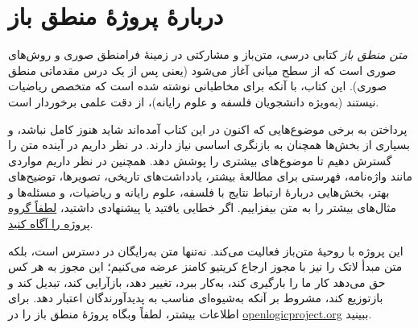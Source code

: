 \chapter*{دربارهٔ پروژهٔ منطق باز}


\textit{متن منطق باز} کتابی درسی، متن‌باز و مشارکتی در زمینهٔ
فرامنطق صوری و روش‌های صوری است که از سطح میانی آغاز می‌شود
(یعنی پس از یک درس مقدماتی منطق صوری). این کتاب، با آنکه برای
مخاطبانی نوشته شده است که متخصص ریاضیات نیستند (به‌ویژه دانشجویان
فلسفه و علوم رایانه)، از دقت علمی برخوردار است.

پرداختن به برخی موضوع‌هایی که اکنون در این کتاب آمده‌اند شاید هنوز
کامل نباشد، و بسیاری از بخش‌ها همچنان به بازنگری اساسی نیاز دارند.
در نظر داریم در آینده متن را گسترش دهیم تا موضوع‌های بیشتری را پوشش
دهد. همچنین در نظر داریم مواردی مانند واژه‌نامه، فهرستی برای مطالعهٔ
بیشتر، یادداشت‌های تاریخی، تصویرها، توضیح‌های بهتر، بخش‌هایی دربارهٔ
ارتباط نتایج با فلسفه، علوم رایانه و ریاضیات، و مسئله‌ها و مثال‌های
بیشتر را به متن بیفزاییم. اگر خطایی یافتید یا پیشنهادی داشتید،
\href{https://github.com/OpenLogicProject/OpenLogic/wiki/Contributing}{لطفاً گروه پروژه را آگاه کنید}.

این پروژه با روحیهٔ متن‌باز فعالیت می‌کند. نه‌تنها متن به‌رایگان در
دسترس است، بلکه متن مبدأ لاتک را نیز با مجوز ارجاع کریتیو کامنز
عرضه می‌کنیم؛ این مجوز به هر کس حق می‌دهد کار ما را بارگیری کند،
به‌کار ببرد، تغییر دهد، بازآرایی کند، تبدیل کند و بازتوزیع کند،
مشروط بر آنکه به‌شیوه‌ای مناسب به پدیدآورندگان اعتبار دهد.
برای اطلاعات بیشتر، لطفاً وبگاه پروژهٔ منطق باز را در
\href{http://openlogicproject.org/}{openlogicproject.org}
ببینید.
